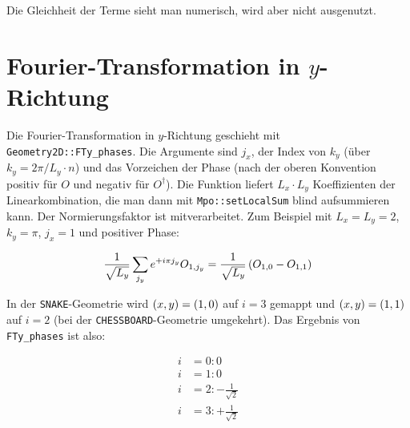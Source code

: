 \documentclass[12pt,paper=a4,BCOR=16mm]{article}
\begin{document}
Die Gleichheit der Terme sieht man numerisch, wird aber nicht ausgenutzt.

\section{Fourier-Transformation in $y$-Richtung}

Die Fourier-Transformation in $y$-Richtung geschieht mit \texttt{Geometry2D::FTy\_phases}. Die Argumente sind $j_x$, der Index von $k_y$ (\"uber $k_y=2\pi/L_y\cdot n$) und das Vorzeichen der Phase (nach der oberen Konvention positiv f\"ur $O$ und negativ f\"ur $O^{\dagger}$).
Die Funktion liefert $L_x \cdot L_y$ Koeffizienten der Linearkombination, die man dann mit \texttt{Mpo::setLocalSum} blind aufsummieren kann. Der Normierungsfaktor ist mitverarbeitet. Zum Beispiel mit $L_x=L_y=2$, $k_y=\pi$, $j_x=1$ und positiver Phase:

\begin{equation}
\frac{1}{\sqrt{L_y}} \sum_{j_y} e^{+i\pi j_y} O_{1,j_y} = \frac{1}{\sqrt{L_y}} \left( O_{1,0} - O_{1,1} \right)
\end{equation}

In der \texttt{SNAKE}-Geometrie wird $\left(x,y\right)=\left(1,0\right)$ auf $i=3$ gemappt und $\left(x,y\right)=\left(1,1\right)$ auf $i=2$ (bei der \texttt{CHESSBOARD}-Geometrie umgekehrt). Das Ergebnis von \texttt{FTy\_phases} ist also:

\begin{equation}
\begin{split}
i&=0: 0\\
i&=1: 0\\
i&=2: -\frac{1}{\sqrt{2}}\\
i&=3: +\frac{1}{\sqrt{2}}
\end{split}
\end{equation}





\end{document}
